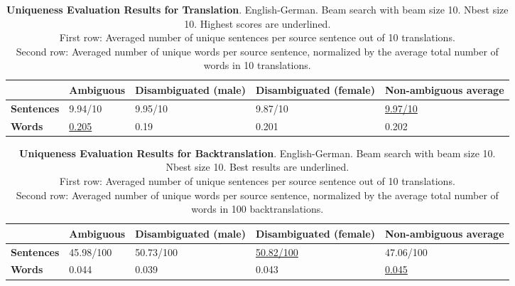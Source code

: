 
\begin{table} 
    \label{tab:uniqueness_translation}
    \begin{tabularx}{\linewidth}{|X|XXXX|}
        \hline
         & \textbf{Ambiguous} & \textbf{Disambiguated (male)} & \textbf{Disambiguated (female)} & \textbf{Non-ambiguous average} \\ \hline
         \textbf{Sentences} & 9.94/10 & 9.95/10 & 9.87/10 & \underline{9.97/10} \\ 
         \textbf{Words} & \underline{0.205} & 0.19 & 0.201 & 0.202 \\ \hline
    \end{tabularx}
    \caption{\textbf{Uniqueness Evaluation Results for Translation}. English-German. Beam search with beam size 10. Nbest size 10. Highest scores are underlined. \\ First row: Averaged number of unique sentences per source sentence out of 10 translations. \\ Second row: Averaged number of unique words per source sentence, normalized by the average total number of words in 10 translations.}
\end{table}

\begin{table} 
    \label{tab:uniqueness_backtranslation}
    \begin{tabularx}{\linewidth}{|X|XXXX|}
        \hline
         & \textbf{Ambiguous} & \textbf{Disambiguated (male)} & \textbf{Disambiguated (female)} & \textbf{Non-ambiguous average} \\ \hline
         \textbf{Sentences} & 45.98/100 & 50.73/100 & \underline{50.82/100} & 47.06/100 \\ 
         \textbf{Words} & 0.044 & 0.039 & 0.043 & \underline{0.045} \\ \hline
    \end{tabularx}
    \caption{\textbf{Uniqueness Evaluation Results for Backtranslation}. English-German. Beam search with beam size 10. Nbest size 10. Best results are underlined. \\ First row: Averaged number of unique sentences per source sentence out of 10 translations. \\ Second row: Averaged number of unique words per source sentence, normalized by the average total number of words in 100 backtranslations.}
\end{table}

